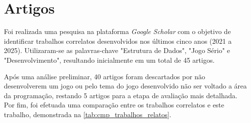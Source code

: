 \section{Artigos}

Foi realizada uma pesquisa na plataforma \emph{Google Scholar} com o objetivo de identificar trabalhos correlatos desenvolvidos nos últimos cinco anos (2021 a 2025). Utilizaram-se as palavras-chave "Estrutura de Dados", "Jogo Sério" e "Desenvolvimento", resultando inicialmente em um total de 45 artigos.

Após uma análise preliminar, 40 artigos foram descartados por não desenvolverem um jogo ou pelo tema do jogo desenvolvido não ser voltado a área da programação, restando 5 artigos para a etapa de avaliação mais detalhada. Por fim, foi efetuada uma comparação entre os trabalhos correlatos e este trabalho, demonstrada na \autoref{tab:cmp_trabalhos_relatos}.








